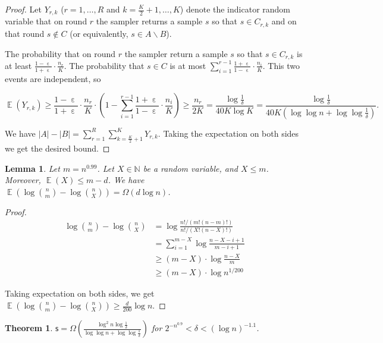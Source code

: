 \documentclass[10pt]{article}
\DeclareMathOperator*{\E}{\mathbb{E}}
\DeclareMathOperator*{\eps}{\varepsilon}
\newtheorem{theorem}{Theorem}
\newtheorem{lemma}{Lemma}
\newcommand{\s}{\textsf{s}\xspace}
\begin{document}
\begin{proof}
  Let $Y_{r,k}$ ($r=1,\ldots, R$ and $k=\frac{K}{2}+1,\ldots, K$) denote the indicator random variable that on round $r$ the sampler returns a sample $s$ so that $s\in C_{r,k}$ and on that round $s\not\in C$ (or equivalently, $s\in A\backslash B$).  
  
  The probability that on round $r$ the sampler return a sample $s$ so that $s\in C_{r,k}$ is at least $\frac{1-\eps}{1+\eps}\cdot \frac{n_r}{K}$. The probability that $s\in C$ is at most $\sum_{i=1}^{r-1}{\frac{1+\eps}{1-\eps}\cdot \frac{n_i}{K}}$. This two events are independent, so 
  
  $$\E(Y_{r,k})\ge \frac{1-\eps}{1+\eps}\cdot \frac{n_r}{K} \cdot (1-\sum_{i=1}^{r-1}{\frac{1+\eps}{1-\eps}\cdot \frac{n_i}{K}}) \ge \frac{n_r}{2K}=\frac{\log \frac{1}{\delta}}{40K\log K}=\frac{\log \frac{1}{\delta}}{40K(\log\log n + \log\log \frac{1}{\delta})}.$$
  
   We have $|A|-|B|=\sum_{r=1}^{R}{\sum_{k=\frac{K}{2}+1}^{K}{Y_{r,k}}}$. Taking the expectation on both sides we get the desired bound.
  
\end{proof}

\begin{lemma} \label{lemma:bits-saving}
  Let $m=n^{0.99}$. Let $X\in \mathbb{N}$ be a random variable, and $X\le m$. Moreover, $\E(X)\le m-d$. We have $\E(\log {n \choose m}-\log {n \choose X})=\Omega(d \log n)$.
\end{lemma}

\begin{proof}
  \begin{align*}
    \log {n \choose m}-\log {n \choose X}
    &=   \log \frac{n!/(m!(n-m)!)}{n!/(X!(n-X)!)} \\
    &=   \sum_{i=1}^{m-X}\log \frac{n-X-i+1}{m-i+1} \\
    &\ge (m-X)\cdot \log \frac{n-X}{m} \\
    &\ge (m-X)\cdot \log n^{1/200}
  \end{align*}
  
  Taking expectation on both sides, we get $\E(\log {n \choose m}-\log {n \choose X})\ge \frac{d}{200} \log n$. 
\end{proof}

\begin{theorem}
  $\s = \Omega(\frac{\log^2 n\log{\frac{1}{\delta}}}{\log\log n+\log\log \frac{1}{\delta}})$ for $2^{-n^{0.9}}<\delta<(\log n)^{-1.1}$.
\end{theorem}
\end{document}
